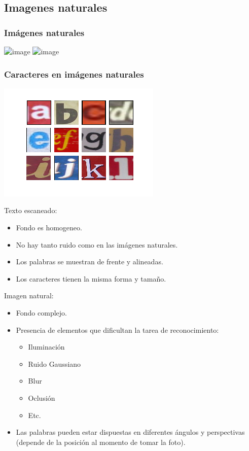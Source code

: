 	\subsection{Imagenes naturales}
		\begin{frame}
			\frametitle{Imágenes naturales}
			\begin{center}
				\includegraphics<1>[height=0.65\paperheight]{imgs/imagen_natural_1.jpg}
				\includegraphics<2>[height=0.65\paperheight]{imgs/imagen_natural_3.jpg}
			\end{center}
		\end{frame}
		\begin{frame}
			\frametitle{Caracteres en imágenes naturales}
			\includegraphics[height=0.65\paperheight]{imgs/caracteres_naturales.png}	
		\end{frame}
		\begin{frame}
			Texto escaneado:
			\begin{itemize}
				\item Fondo es homogeneo.
				\item No hay tanto ruido como en las imágenes naturales.
				\item Los palabras se muestran de frente y alineadas.
				\item Los caracteres tienen la misma forma y tamaño.
			\end{itemize}
		\end{frame}
		\begin{frame}
			Imagen natural:
			\begin{itemize}
				\item Fondo complejo.
				\item Presencia de elementos que dificultan la tarea de reconocimiento:
				\begin{itemize}
					\item Iluminación
					\item Ruido Gaussiano
					\item Blur
					\item Oclusión
					\item Etc.
				\end{itemize}
				\item Las palabras pueden estar dispuestas en diferentes ángulos y perspectivas (depende de la posición al momento de tomar la foto).
			\end{itemize}
		\end{frame}

